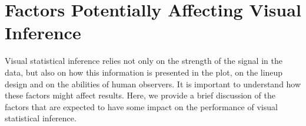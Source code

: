 \documentclass[10pt]{article}\usepackage[]{graphicx}\usepackage[]{xcolor}
\begin{document}
\section{Factors Potentially Affecting Visual Inference} \label{sec:factor_performance} 

Visual statistical inference relies not only on the strength of the signal in the data, but also on how this information is presented in the plot, on the lineup design and on the abilities of human observers. It is important to understand how these factors might affect results.  Here, we provide a brief discussion %
of the factors that are expected to have some impact on the performance of visual statistical inference.  
\end{document}
